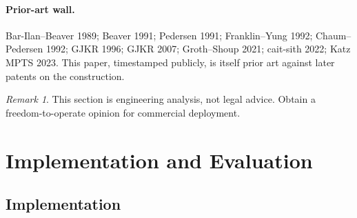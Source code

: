 \documentclass[11pt]{article}
\theoremstyle{plain}
\theoremstyle{definition}
\theoremstyle{remark}
\newtheorem*{remark}{Remark}
\begin{document}
\paragraph{Prior-art wall.} Bar-Ilan--Beaver 1989; Beaver 1991; Pedersen 1991; Franklin--Yung 1992; Chaum--Pedersen 1992; GJKR 1996; GJKR 2007; Groth--Shoup 2021; cait-sith 2022; Katz MPTS 2023. This paper, timestamped publicly, is itself prior art against later patents on the construction.

\begin{remark}
This section is engineering analysis, not legal advice. Obtain a freedom-to-operate opinion for commercial deployment.
\end{remark}

\section{Implementation and Evaluation}\label{sec:impl}

\subsection{Implementation}
\end{document}
